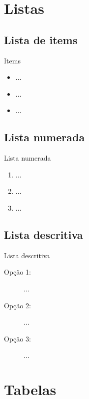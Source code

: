 \documentclass[table,xcolor=table]{apresentacoes/exemplo-2/IFMG-beamer}
\begin{document}
\section{Listas}

\subsection{Lista de items}

\begin{frame}{Items}

	\begin{itemize}[<+->]
		\item ...
    \item ...
    \item ...
  \end{itemize}
  
\end{frame} 

\subsection{Lista numerada}

\begin{frame}{Lista numerada}

	\begin{enumerate}[<+->]
		\item ...
    \item ...
    \item ...
  \end{enumerate}
  
\end{frame} 

\subsection{Lista descritiva} 

\begin{frame}{Lista descritiva} 

	\begin{description}
		\item [Opção 1:] ...
		\item [Opção 2:] ...
		\item [Opção 3:] ...
	\end{description}

\end{frame}


\section{Tabelas}
\end{document}
